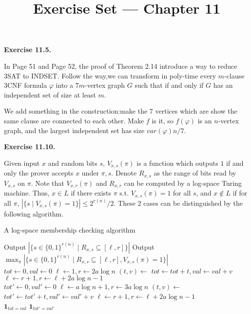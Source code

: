 \documentclass[a4paper]{article}
\title{Exercise Set --- Chapter 11}
\date{}
\newenvironment{exercise}[1]{
	\par
	\noindent\textbf{Exercise #1.}\quad
}{
	\par
	\bigskip
}
\begin{document}
    \maketitle

    \begin{exercise}{11.5}
    	In Page 51 and Page 52, the proof of Theorem 2.14 introduce a way to reduce 3SAT to INDSET. Follow the way,we can transform in poly-time every $m$-clause 3CNF formula $\varphi$ into a $7m$-vertex graph $G$ such that if and only if $G$ has an independent set of size at least $m$.
 
		We add something in the construction:make the $7$ vertices which are show the same clause are connected to each other. Make $f$ is it, so $f(\varphi)$ is an $n$-vertex graph, and the largest independent set has size $var(\varphi)n/7$.
    \end{exercise}

    \begin{exercise}{11.10}
    	Given input $x$ and random bits $s$, $V_{x, s}(\pi)$ is a function which outputs $1$ if and only the prover accepts $x$ under $\pi, s$. Denote $R_{x, s}$ as the range of bits read by $V_{x, s}$ on $\pi$. Note that $V_{x, r}(\pi)$ and $R_{x, r}$ can be computed by a log-space Turing machine. Thus, $x \in L$ if there exists $\pi$ s.t. $V_{x, s}(\pi) = 1$ for all $s$, and $x \not\in L$ if for all $\pi$, $|\{s \mid V_{x, s}(\pi) = 1\}| \leq 2^{r(n)}/2$. These 2 cases can be distinguished by the following algorithm.

    	\begin{algorithm}[H]
        \caption{A log-space membership checking algorithm}\label{alg:soc}
        \begin{algorithmic}
             
            	\State Output $|\{s \in \{0,1\}^{r(n)} \mid R_{x, s} \subseteq [\ell, r]\}|$
            	\State Output $\max_\pi|\{s \in \{0,1\}^{r(n)} \mid R_{x, s} \subseteq [\ell, r], V_{x,s}(\pi) = 1\}|$
            \EndFunction
            \\
            \State $tot \gets 0, val \gets 0$
            \State $\ell \gets 1, r \gets 2a\log n$
            \While{$\ell \leq |\pi|$}
            	\State $(t, v) \gets $ 
            	\State $tot \gets tot + t, val \gets val + v$
            	\State $\ell \gets r + 1, r \gets \ell + 2a\log n - 1$
            \EndWhile
            \\
            \State $tot' \gets 0, val' \gets 0$
            \State $\ell \gets a\log n + 1, r \gets 3a\log n$
            \While{$\ell \leq |\pi|$}
            	\State $(t, v) \gets $ 
            	\State $tot' \gets tot' + t, val' \gets val' + v$
            	\State $\ell \gets r + 1, r \gets \ell + 2a\log n - 1$
            \EndWhile
            \\
      			\State \Return $\mathbf 1_{tot = val}$
            \Else
            	\State \Return $\mathbf 1_{tot' = val'}$
            \EndIf
        \end{algorithmic}
    \end{algorithm}
    \end{exercise}
\end{document}
